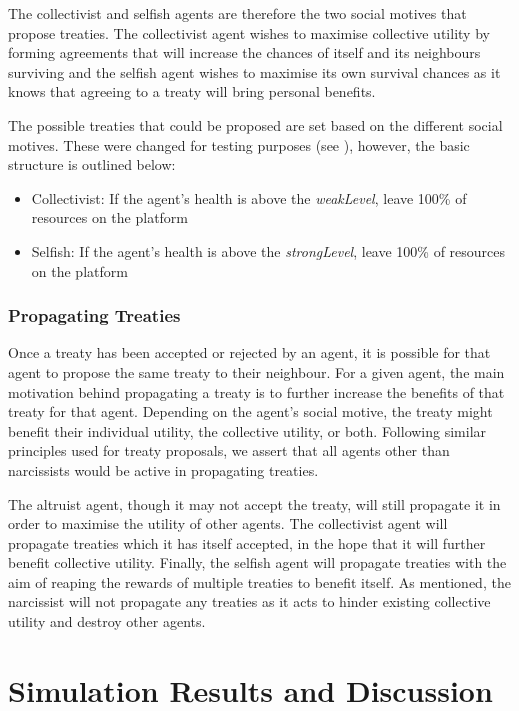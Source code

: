 The collectivist and selfish agents are therefore the two social motives that propose treaties. The collectivist agent wishes to maximise collective utility by forming agreements that will increase the chances of itself and its neighbours surviving and the selfish agent wishes to maximise its own survival chances as it knows that agreeing to a treaty will bring personal benefits.

The possible treaties that could be proposed are set based on the different social motives. These were changed for testing purposes (see ), however, the basic structure is outlined below:
\begin{itemize}
    \item Collectivist: If the agent's health is above the \textit{weakLevel}, leave 100\% of resources on the platform
    \item Selfish: If the agent's health is above the \textit{strongLevel}, leave 100\% of resources on the platform
\end{itemize}

\subsubsection{Propagating Treaties}

Once a treaty has been accepted or rejected by an agent, it is possible for that agent to propose the same treaty to their neighbour. For a given agent, the main motivation behind propagating a treaty is to further increase the benefits of that treaty for that agent. Depending on the agent's social motive, the treaty might benefit their individual utility, the collective utility, or both. Following similar principles used for treaty proposals, we assert that all agents other than narcissists would be active in propagating treaties.

The altruist agent, though it may not accept the treaty, will still propagate it in order to maximise the utility of other agents. The collectivist agent will propagate treaties which it has itself accepted, in the hope that it will further benefit collective utility. Finally, the selfish agent will propagate treaties with the aim of reaping the rewards of multiple treaties to benefit itself. As mentioned, the narcissist will not propagate any treaties as it acts to hinder existing collective utility and destroy other agents. 



\section{Simulation Results and Discussion}\label{simulation_results}

